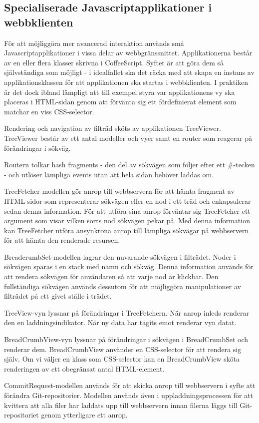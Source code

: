 \subsection{Specialiserade Javascriptapplikationer i webbklienten}
För att möjliggöra mer avancerad interaktion används små Javascriptapplikationer i vissa delar av webbgränssnittet. Applikationerna består av en eller flera klasser skrivna i CoffeeScript. Syftet är att göra dem så självständiga som möjligt - i idealfallet ska det räcka med att skapa en instans av applikationsklassen för att applikationen ska startas i webbklienten. I praktiken är det dock ibland lämpligt att till exempel styra var applikationens vy ska placeras i HTML-sidan genom att förvänta sig ett fördefinierat element som matchar en viss CSS-selector.

Rendering och navigation av filträd sköts av applikationen TreeViewer. TreeViewer består av ett antal modeller och vyer samt en router som reagerar på förändringar i sökväg. 

Routern tolkar hash fragments - den del av sökvägen som följer efter ett \#-tecken - och utlöser lämpliga events utan att hela sidan behöver laddas om.

TreeFetcher-modellen gör anrop till webbservern för att hämta fragment av HTML-sidor som representerar sökvägen eller en nod i ett träd och enkapsulerar sedan denna information. För att utföra sina anrop förväntar sig TreeFetcher ett argument som visar vilken sorts nod sökvägen pekar på. Med denna information kan TreeFetcher utföra ansynkrona anrop till lämpliga sökvägar på webbservern för att hämta den renderade resursen.

BreadcrumbSet-modellen lagrar den nuvarande sökvägen i filträdet. Noder i sökvägen sparas i en stack med namn och sökväg. Denna information används för att rendera sökvägen för användaren så att varje nod är klickbar. Den fullständiga sökvägen används dessutom för att möjliggöra manipulationer av filträdet på ett givet ställe i trädet.

TreeView-vyn lyssnar på förändringar i TreeFetchern. När anrop inleds renderar den en laddningsindikator. När ny data har tagits emot renderar vyn datat.

BreadCrumbView-vyn lyssnar på förändringar i sökvägen i BreadCrumbSet och renderar dem. BreadCrumbView använder en CSS-selector för att rendera sig själv. Om vi väljer en klass som CSS-selector kan en BreadCrumbView sköta renderingen av ett obegränsat antal HTML-element.

CommitRequest-modellen används för att skicka anrop till webbservern i syfte att förändra Git-repositorier. Modellen används även i uppladdningsprocessen för att kvittera att alla filer har laddats upp till webbservern innan filerna läggs till Git-repositoriet genom ytterligare ett anrop.